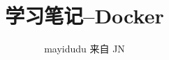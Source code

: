 \documentclass{ctexart}
\newcommand{\jn}{JN}
\begin{document}
\title{学习笔记--Docker}
\author{mayidudu 来自 \jn}
\maketitle
\end{document}
